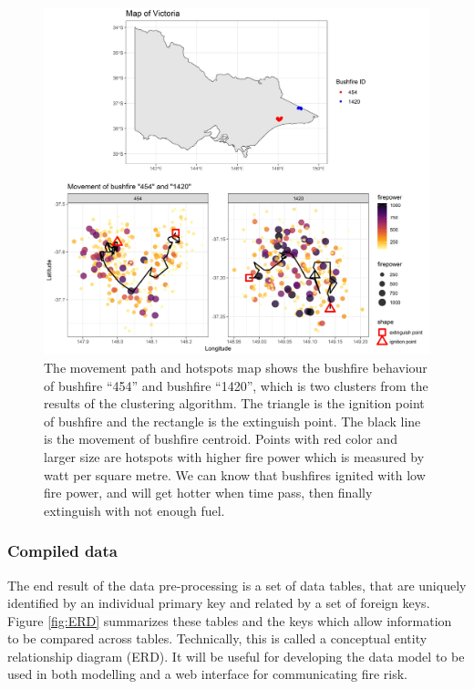 \documentclass[11pt,a4paper,]{article}
\begin{document}
\begin{figure}
\centering
\includegraphics[width=5.20833in,height=\textheight]{figures/fire_mov.jpg}
\caption{The movement path and hotspots map shows the bushfire behaviour of bushfire ``454'' and bushfire ``1420'', which is two clusters from the results of the clustering algorithm. The triangle is the ignition point of bushfire and the rectangle is the extinguish point. The black line is the movement of bushfire centroid. Points with red color and larger size are hotspots with higher fire power which is measured by watt per square metre. We can know that bushfires ignited with low fire power, and will get hotter when time pass, then finally extinguish with not enough fuel. \label{fig:mov}}
\end{figure}

\hypertarget{compiled-data}{%
\subsubsection{Compiled data}\label{compiled-data}}

The end result of the data pre-processing is a set of data tables, that are uniquely identified by an individual primary key and related by a set of foreign keys. Figure \ref{fig:ERD} summarizes these tables and the keys which allow information to be compared across tables. Technically, this is called a conceptual entity relationship diagram (ERD). It will be useful for developing the data model to be used in both modelling and a web interface for communicating fire risk.
\end{document}
